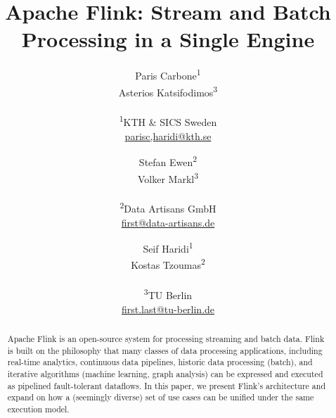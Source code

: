 \documentclass[11pt]{article}
\begin{document}
\title{Apache Flink\texttrademark: Stream and Batch Processing in a Single Engine}

\author{Paris Carbone\textsuperscript{1} \\ Asterios Katsifodimos\textsuperscript{3} \\\\ \small{ \textsf{\small \textsuperscript{1}KTH \& SICS Sweden}} \\ \small \href{parisc,haridi@kth.se}{parisc,haridi@kth.se}
\and Stefan Ewen\textsuperscript{2} \\ Volker Markl\textsuperscript{3} \\\\ \small \textsf{\textsuperscript{2}Data Artisans GmbH} \\ \small \href{first@data-artisans.de}{first@data-artisans.de}
\and Seif Haridi\textsuperscript{1} \\ Kostas Tzoumas\textsuperscript{2} \\\\ \small \textsf{\textsuperscript{3}TU Berlin} \\ \small \href{fist.last@tu-berlin.de}{first.last@tu-berlin.de}
%
\vspace{-5mm}
}




\maketitle

\begin{abstract}
Apache Flink is an open-source system for processing streaming and batch data. Flink is built on the philosophy that many classes of data processing applications, including real-time analytics, continuous data pipelines, historic data processing (batch), and iterative algorithms (machine learning, graph analysis) can be expressed and executed as pipelined fault-tolerant dataflows. In this paper, we present Flink's architecture and expand on how a (seemingly diverse) set of use cases can be unified under the same execution model.
\end{abstract}

\end{document}
